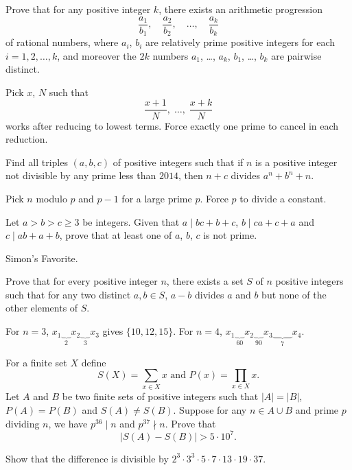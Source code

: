 \documentclass[11pt]{scrartcl}
\begin{document}
\begin{problem}
  [APMO 2009/4] Prove that for any positive integer $k$,
  there exists an arithmetic progression
  \[ \frac{a_1}{b_1}, \quad \frac{a_2}{b_2}, \quad \dots,
    \quad \frac{a_k}{b_k} \]
  of rational numbers, where $a_i$, $b_i$ are relatively prime positive integers for each $i=1,2,\dots,k$, and moreover
  the $2k$ numbers $a_1$, \dots, $a_k$, $b_1$, \dots, $b_k$
  are pairwise distinct.
  \begin{hint}
    Pick $x$, $N$ such that
    \[ \frac{x+1}{N}, \; \dots, \;  \frac{x+k}{N} \]
    works after reducing to lowest terms.
    Force exactly one prime to cancel in each reduction.
  \end{hint}
\end{problem}

\begin{problem}
  Find all triples $(a,b,c)$ of positive integers such that if $n$ is a positive integer
  not divisible by any prime less than $2014$, then $n+c$ divides $a^n+b^n+n$.
  \begin{hint}
    Pick $n$ modulo $p$ and $p-1$ for a large prime $p$.
    Force $p$ to divide a constant.
  \end{hint}
\end{problem}

\begin{problem}
  Let $a > b > c \ge 3$ be integers.
  Given that $a \mid bc+b+c$, $b \mid ca+c+a$ and $c \mid ab+a+b$,
  prove that at least one of $a$, $b$, $c$ is not prime.
  \begin{hint}
    Simon's Favorite.
  \end{hint}
\end{problem}

\begin{problem}
  Prove that for every positive integer $n$, there exists a set $S$ of $n$ positive integers
  such that for any two distinct $a,b \in S$, $a-b$ divides $a$ and $b$
  but none of the other elements of $S$.
  \begin{hint}
    For $n=3$, $x_1 \underbrace{\quad}_{2} x_2 \underbrace{\quad}_{3} x_3$ gives $\{10,12,15\}$.
    For $n=4$,
    $x_1 \underbrace{\quad}_{60} x_2 \underbrace{\quad}_{90} x_3 \underbrace{\qquad}_{7} x_4$.
  \end{hint}
\end{problem}

\begin{problem}
  For a finite set $X$ define
  \[ S(X) = \sum_{x \in X} x \text{ and }  P(x) = \prod_{x \in X} x.  \]
  Let $A$ and $B$ be two finite sets of positive integers
  such that $\left\lvert A \right\rvert = \left\lvert B \right\rvert$, $P(A) = P(B)$ and $S(A) \neq S(B)$.
  Suppose for any $n \in A \cup B$ and prime $p$ dividing $n$,
  we have $p^{36} \mid n$ and $p^{37} \nmid n$.
  Prove that \[ \left\lvert S(A) - S(B) \right\rvert > 5 \cdot 10^{7}. \]
  \begin{hint}
    Show that the difference is divisible by
    $2^3 \cdot 3^3 \cdot 5 \cdot 7 \cdot 13 \cdot 19 \cdot 37$.
  \end{hint}
\end{problem}
\end{document}
